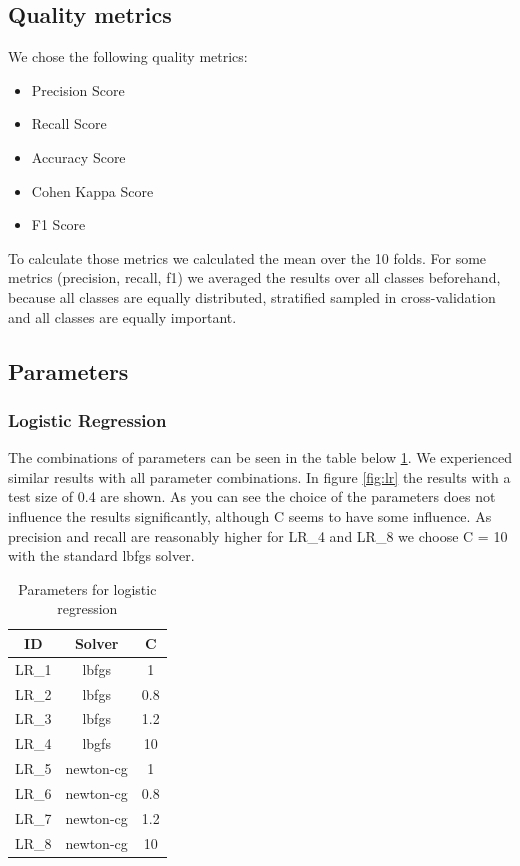 \documentclass{sig-alternate-05-2015}
\begin{document}
\subsection{Quality metrics}

We chose the following quality metrics:
\begin{itemize}
	\item Precision Score
	\item Recall Score
	\item Accuracy Score
	\item Cohen Kappa Score
	\item F1 Score
\end{itemize}

To calculate those metrics we calculated the mean over the 10 folds.
For some metrics (precision, recall, f1) we averaged the results over all classes beforehand, because all classes are equally distributed, stratified sampled in cross-validation and all classes are equally important.

\newpage

\subsection{Parameters}

\subsubsection{Logistic Regression}
The combinations of parameters can be seen in the table below \ref{tbl:logreg}.
We experienced similar results with all parameter combinations.
In figure \ref{fig:lr} the results with a test size of 0.4 are shown.
As you can see the choice of the parameters does not influence the results significantly, although C seems to have some influence.
As precision and recall are reasonably higher for LR\_4 and LR\_8 we choose C = 10 with the standard lbfgs solver.

\begin{table}[h]
\centering
\caption{Parameters for logistic regression}
\label{tbl:logreg}
\begin{tabular}{|c|c|c|}
\hline
ID & Solver & C \\ 
\hline 
LR\_1 & lbfgs & 1 \\ 
\hline 
LR\_2 & lbfgs & 0.8 \\ 
\hline 
LR\_3 & lbfgs & 1.2 \\ 
\hline 
LR\_4 & lbgfs & 10 \\ 
\hline 
LR\_5 & newton-cg & 1 \\ 
\hline 
LR\_6 & newton-cg & 0.8 \\ 
\hline 
LR\_7 & newton-cg & 1.2 \\ 
\hline 
LR\_8 & newton-cg & 10 \\ 
\hline
\end{tabular} 
\end{table}
\end{document}
